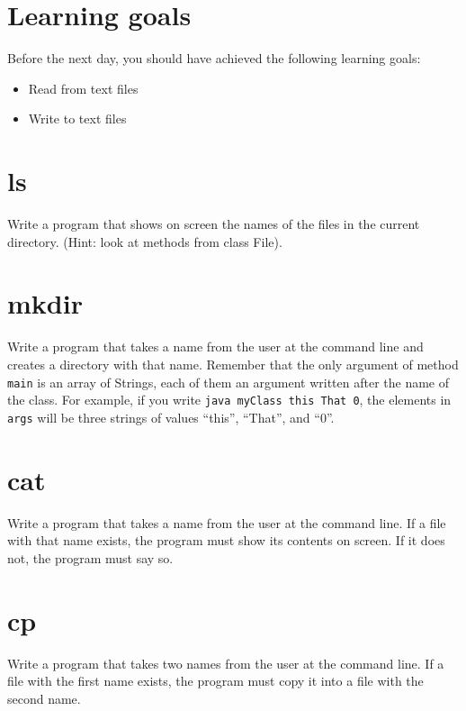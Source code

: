 \documentclass{article}
\begin{document}
\section*{Learning goals}
\label{sec:learning-goals}

Before the next day, you should have achieved the following learning
goals: 

\begin{itemize}
\item Read from text files
\item Write to text files
\end{itemize}

\section{ls}
\label{sec:ls}

Write a program that shows on screen the names of the files in the
current directory. (Hint: look at methods from class File). 

\section{mkdir}
\label{sec:mkdir}

Write a program that takes a name from the user at the command line
and creates a directory with that name. Remember that the only
argument of method \verb+main+ is an array of Strings, each of them
an argument written after the name of the class. For example, if you
write \verb+java myClass this That 0+, the elements in \verb+args+
will be three strings of values ``this'', ``That'', and ``0''. 

\section{cat}
\label{sec:cat}

Write a program that takes a name from the user at the command
line. If a file with that name exists, the program must show its
contents on screen. If it does not, the program must say so. 

\section{cp}
\label{sec:cp}

Write a program that takes two names from the user at the command
line. If a file with the first name exists, the program must copy it
into a file with the second name. 
\end{document}
